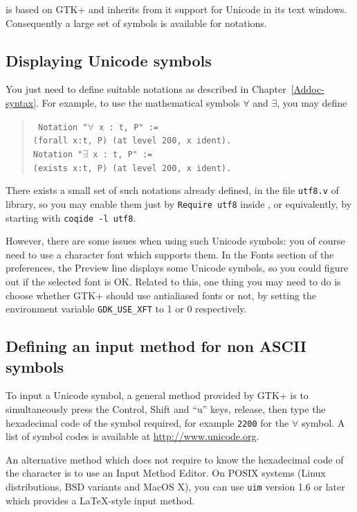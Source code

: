 \CoqIDE{} is based on GTK+ and inherits from it support for Unicode in
its text windows. Consequently a large set of symbols is available for
notations.

\subsection{Displaying Unicode symbols}

You just need to define suitable notations as described in
Chapter~\ref{Addoc-syntax}. For example, to use the mathematical symbols
$\forall$ and $\exists$, you may define 
\begin{quote}\tt
Notation "$\forall$ x : t, P" := \\
\qquad  (forall x:t, P) (at level 200, x ident).\\
Notation "$\exists$ x : t, P" := \\
\qquad  (exists x:t, P) (at level 200, x ident).
\end{quote}
There exists a small set of such notations already defined, in the
file \verb|utf8.v| of \Coq{} library, so you may enable them just by 
\verb|Require utf8| inside \CoqIDE{}, or equivalently, by starting
\CoqIDE{} with \verb|coqide -l utf8|.

However, there are some issues when using such Unicode symbols: you of
course need to use a character font which supports them. In the Fonts
section of the preferences, the Preview line displays some Unicode symbols, so
you could figure out if the selected font is OK. Related to this, one
thing you may need to do is choose whether GTK+ should use antialiased
fonts or not, by setting the environment variable \verb|GDK_USE_XFT|
to 1 or 0 respectively.

\subsection{Defining an input method for non ASCII symbols}

To input a Unicode symbol, a general method provided by GTK+
is to simultaneously press the
Control, Shift and ``u'' keys, release, then type the hexadecimal code of the
symbol required, for example \verb|2200| for the $\forall$ symbol.
A list of symbol codes is available at \url{http://www.unicode.org}. 

An alternative method which does not require to know the hexadecimal
code of the character is to use an Input Method Editor. On POSIX
systems (Linux distributions, BSD variants and MacOS X), you can use
\texttt{uim} version 1.6 or later which provides a \LaTeX{}-style
input method.

